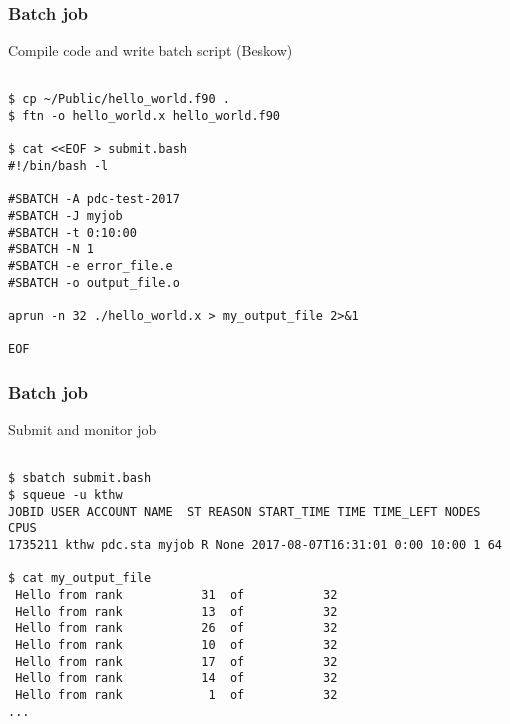 \begin{frame}[fragile]
  \frametitle{Batch job}
  \begin{alertblock}{Compile code and write batch script (Beskow)}
    \verbatimfont{\footnotesize}
    \begin{verbatim}

$ cp ~/Public/hello_world.f90 .
$ ftn -o hello_world.x hello_world.f90

$ cat <<EOF > submit.bash
#!/bin/bash -l

#SBATCH -A pdc-test-2017
#SBATCH -J myjob
#SBATCH -t 0:10:00
#SBATCH -N 1
#SBATCH -e error_file.e
#SBATCH -o output_file.o

aprun -n 32 ./hello_world.x > my_output_file 2>&1

EOF

 \end{verbatim}
\end{alertblock}


\end{frame}



\begin{frame}[fragile]
  \frametitle{Batch job}
  \begin{alertblock}{Submit and monitor job}
    \verbatimfont{\footnotesize}
    \begin{verbatim}

$ sbatch submit.bash
$ squeue -u kthw
JOBID USER ACCOUNT NAME  ST REASON START_TIME TIME TIME_LEFT NODES CPUS
1735211 kthw pdc.sta myjob R None 2017-08-07T16:31:01 0:00 10:00 1 64

$ cat my_output_file
 Hello from rank           31  of           32
 Hello from rank           13  of           32
 Hello from rank           26  of           32
 Hello from rank           10  of           32
 Hello from rank           17  of           32
 Hello from rank           14  of           32
 Hello from rank            1  of           32
...


 \end{verbatim}
\end{alertblock}


\end{frame}





